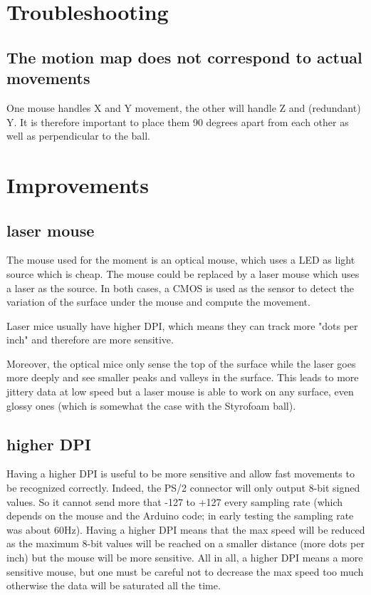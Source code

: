 \documentclass[a4paper]{article}
\begin{document}
\section{Troubleshooting}
\subsection{The motion map does not correspond to actual movements}
One mouse handles X and Y movement, the other will handle Z and (redundant) Y. It is therefore important to place them 90 degrees apart from each other as well as perpendicular to the ball.
\section{Improvements}
\subsection{laser mouse}
The mouse used for the moment is an optical mouse, which uses a LED as light source which is cheap. The mouse could be replaced by a laser mouse which uses a laser as the source.
In both cases, a CMOS is used as the sensor to detect the variation of the surface under the mouse and compute the movement.

Laser mice usually have higher DPI, which means they can track more "dots per inch" and therefore are more sensitive.

Moreover, the optical mice only sense the top of the surface while the laser goes more deeply and see smaller peaks and valleys in the surface. This leads to more jittery data at low speed but a laser mouse is able to work on any surface, even glossy ones (which is somewhat the case with the Styrofoam ball).

\subsection{higher DPI}
Having a higher DPI is useful to be more sensitive and allow fast movements to be recognized correctly. Indeed, the PS/2 connector will only output 8-bit signed values. So it cannot send more that -127 to +127 every sampling rate (which depends on the mouse and the Arduino code; in early testing the sampling rate was about 60Hz). 
Having a higher DPI means that the max speed will be reduced as the maximum 8-bit values will be reached on a smaller distance (more dots per inch) but the mouse will be more sensitive.
All in all, a higher DPI means a more sensitive mouse, but one must be careful not to decrease the max speed too much otherwise the data will be saturated all the time.
\end{document}
